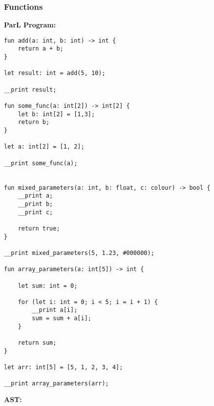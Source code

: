 \newpage

\subsubsection{Functions}

\textbf{ParL Program:}
{
    \lstset{xleftmargin=0.2\textwidth}

    \begin{lstlisting}
fun add(a: int, b: int) -> int {
    return a + b;
}

let result: int = add(5, 10);

__print result;

fun some_func(a: int[2]) -> int[2] {
    let b: int[2] = [1,3];
    return b;
}

let a: int[2] = [1, 2];

__print some_func(a);


fun mixed_parameters(a: int, b: float, c: colour) -> bool {
    __print a;
    __print b;
    __print c;

    return true;
}

__print mixed_parameters(5, 1.23, #000000);

fun array_parameters(a: int[5]) -> int {

    let sum: int = 0;

    for (let i: int = 0; i < 5; i = i + 1) {
        __print a[i];
        sum = sum + a[i];
    }

    return sum;
}

let arr: int[5] = [5, 1, 2, 3, 4];

__print array_parameters(arr);

\end{lstlisting}
}

\newpage

\textbf{AST:}

